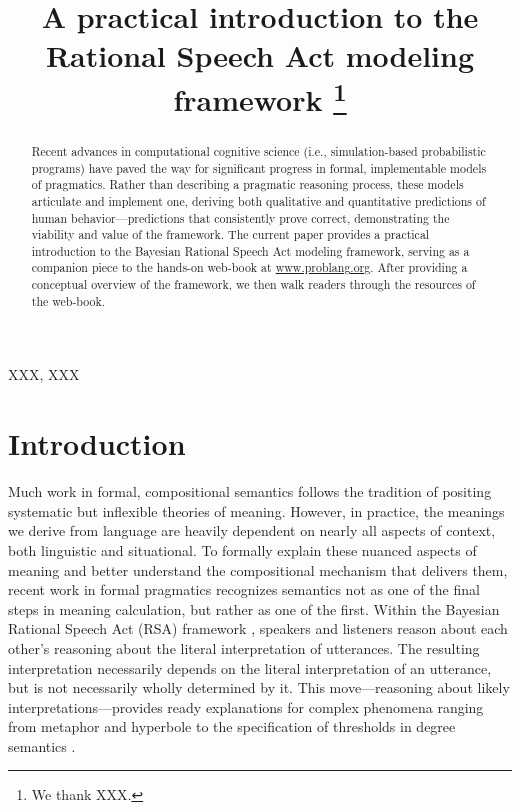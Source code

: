 \documentclass{sp}
\title[Practical introduction to RSA]{A practical introduction to the Rational Speech Act modeling framework%
	\thanks{We thank XXX.}}
\author[]{%
}
\begin{document}
\maketitle

\begin{abstract}
	Recent advances in computational cognitive science (i.e., simulation-based probabilistic programs) have paved the way for significant progress in formal, implementable models of pragmatics. Rather than describing a pragmatic reasoning process, these models articulate and implement one, deriving both qualitative and quantitative predictions of human behavior---predictions that consistently prove correct, demonstrating the viability and value of the framework. The current paper provides a practical introduction to the Bayesian Rational Speech Act modeling framework, serving as a companion piece to the hands-on web-book at \href{https://www.problang.org}{www.problang.org}. After providing a conceptual overview of the framework, we then walk readers through the resources of the web-book.
\end{abstract}

\begin{keywords}
	XXX, XXX
\end{keywords}

\tableofcontents

\section{Introduction}

Much work in formal, compositional semantics follows the tradition of positing systematic but inflexible theories of meaning. However, in practice, the meanings we derive from language are heavily dependent on nearly all aspects of context, both linguistic and situational. To formally explain these nuanced aspects of meaning and better understand the compositional mechanism that delivers them, recent work in formal pragmatics recognizes semantics not as one of the final steps in meaning calculation, but rather as one of the first. Within the Bayesian Rational Speech Act (RSA) framework \citep{goodmanfrank2016,frankejaeger2016}, speakers and listeners reason about each other's reasoning about the literal interpretation of utterances. The resulting interpretation necessarily depends on the literal interpretation of an utterance, but is not necessarily wholly determined by it. This move---reasoning about likely interpretations---provides ready explanations for complex phenomena ranging from metaphor \citep{kaoetal2014metaphor} and hyperbole \citep{kaoetal2014} to the specification of thresholds in degree semantics \citep{lassitergoodman2013}.
\end{document}
